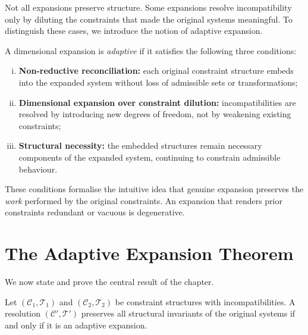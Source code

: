 \documentclass[11pt,openany]{book}
\begin{document}
Not all expansions preserve structure. Some expansions
resolve incompatibility only by diluting the constraints
that made the original systems meaningful. To distinguish
these cases, we introduce the notion of adaptive expansion.

\begin{definition}
\label{def:adaptive-expansion}
A dimensional expansion is \emph{adaptive} if it satisfies
the following three conditions:
\begin{enumerate}[(i)]
\item \textbf{Non-reductive reconciliation:} each original
constraint structure embeds into the expanded system
without loss of admissible sets or transformations;
\item \textbf{Dimensional expansion over constraint
dilution:} incompatibilities are resolved by introducing
new degrees of freedom, not by weakening existing
constraints;
\item \textbf{Structural necessity:} the embedded
structures remain necessary components of the expanded
system, continuing to constrain admissible behaviour.
\end{enumerate}
\end{definition}

\begin{remark}
These conditions formalise the intuitive idea that genuine
expansion preserves the \emph{work} performed by the
original constraints. An expansion that renders prior
constraints redundant or vacuous is degenerative.
\end{remark}

\section{The Adaptive Expansion Theorem}
\label{sec:theorem-expansion}

We now state and prove the central result of the chapter.

\begin{theorem}
\label{thm:adaptive-expansion}
Let $(\mathcal{C}_1, \mathcal{T}_1)$ and
$(\mathcal{C}_2, \mathcal{T}_2)$ be constraint structures
with incompatibilities. A resolution
$(\mathcal{C}', \mathcal{T}')$ preserves all structural
invariants of the original systems if and only if it is an
adaptive expansion.
\end{theorem}
\end{document}
